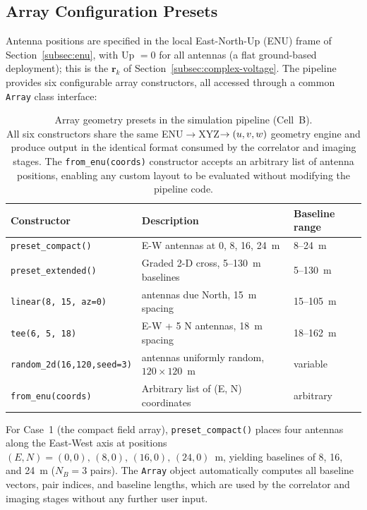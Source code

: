 \subsection{Array Configuration Presets}
\label{subsec:array-presets}

Antenna positions are specified in the local East-North-Up (ENU) frame of
Section~\ref{subsec:enu}, with Up $= 0$ for all antennas (a flat
ground-based deployment); this is the $\bm{r}_k$ of
Section~\ref{subsec:complex-voltage}. The pipeline provides six configurable
array constructors, all accessed through a common \texttt{Array} class
interface:

\begin{table}[H]
  \centering
  \caption[Array geometry presets in the simulation pipeline (Cell~B)]{Array geometry presets in the simulation pipeline (Cell~B).\\[4pt]
  All six constructors share the same ENU$\rightarrow$XYZ$\rightarrow(u,v,w)$
  geometry engine and produce output in the identical format consumed by the
  correlator and imaging stages. The \texttt{from\_enu(coords)} constructor
  accepts an arbitrary list of antenna positions, enabling any custom layout
  to be evaluated without modifying the pipeline code.}
  \label{tab:array-presets}
  \renewcommand{\arraystretch}{1.25}
  \begin{tabularx}{\textwidth}{l >{\raggedright\arraybackslash}X l}
    \toprule
    \textbf{Constructor} & \textbf{Description} & \textbf{Baseline range} \\
    \midrule
    \texttt{preset\_compact()}         & 4 E-W antennas at 0, 8, 16, 24~m          & 8--24~m \\
    \texttt{preset\_extended()}        & Graded 2-D cross, 5--130~m baselines       & 5--130~m \\
    \texttt{linear(8, 15, az=0)}       & 8 antennas due North, 15~m spacing         & 15--105~m \\
    \texttt{tee(6, 5, 18)}             & 6 E-W + 5 N antennas, 18~m spacing        & 18--162~m \\
    \texttt{random\_2d(16,120,seed=3)} & 16 antennas uniformly random, $120\times120$~m & variable \\
    \texttt{from\_enu(coords)}         & Arbitrary list of (E, N) coordinates       & arbitrary \\
    \bottomrule
  \end{tabularx}
\end{table}

For Case~1 (the compact field array), \texttt{preset\_compact()} places four
antennas along the East-West axis at positions
$(E,N) = (0,0),\,(8,0),\,(16,0),\,(24,0)$~m, yielding baselines of 8, 16, and
24~m ($N_B = 3$ pairs). The \texttt{Array} object automatically computes all
baseline vectors, pair indices, and baseline lengths, which are used by the
correlator and imaging stages without any further user input.

